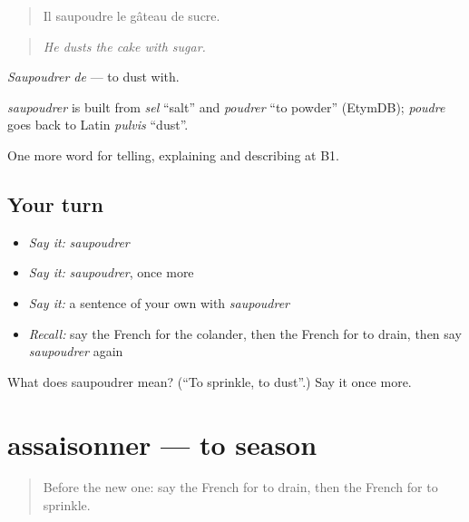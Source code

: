 \begin{quote}
Il saupoudre le gâteau de sucre.
\end{quote}

\begin{quote}
\emph{He dusts the cake with sugar.}
\end{quote}

\emph{Saupoudrer de} — to dust with.

\begin{cousinweb}
\emph{saupoudrer} is built from \emph{sel} \textquotedblleft{}salt\textquotedblright{} and \emph{poudrer} \textquotedblleft{}to powder\textquotedblright{} (EtymDB); \emph{poudre} goes back to Latin \emph{pulvis} \textquotedblleft{}dust\textquotedblright{}.
\end{cousinweb}

\begin{grammarlens}[title={What you've built}]
One more word for telling, explaining and describing at B1.
\end{grammarlens}

\subsection*{Your turn}
\begin{itemize}
\raggedright
  \item \emph{Say it:} \emph{saupoudrer}
  \item \emph{Say it:} \emph{saupoudrer}, once more
  \item \emph{Say it:} a sentence of your own with \emph{saupoudrer}
  \item \emph{Recall:} say the French for the colander, then the French for to drain, then say \emph{saupoudrer} again
\end{itemize}

\begin{tcolorbox}[breakable,colback=teal!4,colframe=teal!35!black,title={Before you move on}]
What does saupoudrer mean? (\textquotedblleft{}To sprinkle, to dust\textquotedblright{}.) Say it once more.
\end{tcolorbox}
\section[assaisonner]{assaisonner — to season}

\label{lesson:FR-C332-assaisonner}



\begin{quote}
Before the new one: say the French for to drain, then the French for to sprinkle.
\end{quote}

